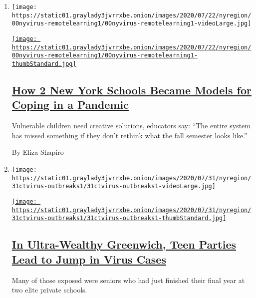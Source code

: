 \begin{enumerate}
\def\labelenumi{\arabic{enumi}.}
\item
  \texttt{[image: https://static01.graylady3jvrrxbe.onion/images/2020/07/22/nyregion/00nyvirus-remotelearning1/00nyvirus-remotelearning1-videoLarge.jpg]}

  \href{/2020/07/31/nyregion/nyc-homeless-children-school.html}{\texttt{[image: https://static01.graylady3jvrrxbe.onion/images/2020/07/22/nyregion/00nyvirus-remotelearning1/00nyvirus-remotelearning1-thumbStandard.jpg]}}

  \hypertarget{how-2-new-york-schools-became-models-for-coping-in-a-pandemic}{%
  \subsection{\texorpdfstring{\href{/2020/07/31/nyregion/nyc-homeless-children-school.html}{How
  2 New York Schools Became Models for Coping in a
  Pandemic}}{How 2 New York Schools Became Models for Coping in a Pandemic}}\label{how-2-new-york-schools-became-models-for-coping-in-a-pandemic}}

  Vulnerable children need creative solutions, educators say: ``The
  entire system has missed something if they don't rethink what the fall
  semester looks like.''

  By Eliza Shapiro
\item
  \texttt{[image: https://static01.graylady3jvrrxbe.onion/images/2020/07/31/nyregion/31ctvirus-outbreaks1/31ctvirus-outbreaks1-videoLarge.jpg]}

  \href{/2020/07/31/nyregion/greenwich-ct-coronavirus-covid-parties.html}{\texttt{[image: https://static01.graylady3jvrrxbe.onion/images/2020/07/31/nyregion/31ctvirus-outbreaks1/31ctvirus-outbreaks1-thumbStandard.jpg]}}

  \hypertarget{in-ultra-wealthy-greenwich-teen-parties-lead-to-jump-in-virus-cases}{%
  \subsection{\texorpdfstring{\href{/2020/07/31/nyregion/greenwich-ct-coronavirus-covid-parties.html}{In
  Ultra-Wealthy Greenwich, Teen Parties Lead to Jump in Virus
  Cases}}{In Ultra-Wealthy Greenwich, Teen Parties Lead to Jump in Virus Cases}}\label{in-ultra-wealthy-greenwich-teen-parties-lead-to-jump-in-virus-cases}}

  Many of those exposed were seniors who had just finished their final
  year at two elite private schools.


\end{enumerate}
